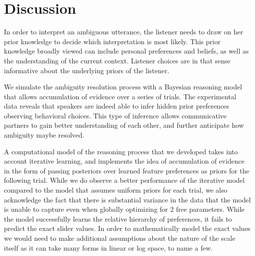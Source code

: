 \documentclass[10pt,a4paper]{article}
\begin{document}
%

\section{Discussion}

In order to interpret an ambiguous utterance, the listener needs to draw on her prior knowledge to decide which interpretation is most likely. This prior knowledge broadly viewed can include personal preferences and beliefs, as well as the understanding of the current context. Listener choices are in that sense informative about the underlying priors of the listener. 

We simulate the ambiguity resolution process with a Bayesian reasoning model that allows accumulation of evidence over a series of trials. The experimental data reveals that speakers are indeed able to infer hidden prior preferences observing behavioral choices. This type of inference allows communicative partners to gain better understanding of each other, and further anticipate how ambiguity maybe resolved.

A computational model of the reasoning process that we developed takes into account iterative learning, and implements the idea of accumulation of evidence in the form of passing posteriors over learned feature preferences as priors for the following trial. While we do observe a better performance of the iterative model compared to the model that assumes uniform priors for each trial, we also acknowledge the fact that there is substantial variance in the data that the model is unable to capture even when globally optimizing for 2 free parameters.  While the model successfully learns the relative hierarchy of preferences, it fails to predict the exact slider values. In order to mathematically model the exact values we would need to make additional assumptions about the nature of the scale itself as it can take many forms in linear or log space, to name a few.
\end{document}
